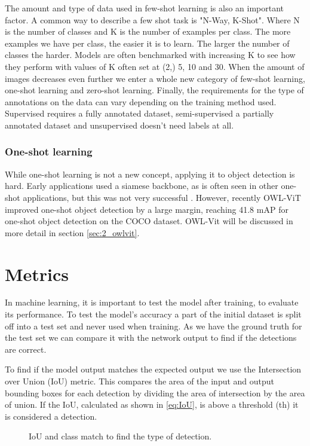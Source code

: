 The amount and type of data used in few-shot learning is also an important factor. A common way to describe a few shot task is "N-Way, K-Shot". Where N is the number of classes and K is the number of examples per class. The more examples we have per class, the easier it is to learn. The larger the number of classes the harder. Models are often benchmarked with increasing K to see how they perform with values of K often set at (2,) 5, 10 and 30. When the amount of images decreases even further we enter a whole new category of few-shot learning, one-shot learning and zero-shot learning. Finally, the requirements for the type of annotations on the data can vary depending on the training method used. Supervised requires a fully annotated dataset, semi-supervised a partially annotated dataset and unsupervised doesn't need labels at all.

\subsubsection*{One-shot learning}

While one-shot learning is not a new concept, applying it to object detection is hard. Early applications used a siamese backbone, as is often seen in other one-shot applications, but this was not very successful \citep{One-shot-siamese}. However, recently OWL-ViT \citep{owlvit} improved one-shot object detection by a large margin, reaching 41.8 mAP for one-shot object detection on the COCO dataset. OWL-Vit will be discussed in more detail in section \ref{sec:2_owlvit}.


\section{Metrics}
In machine learning, it is important to test the model after training, to evaluate its performance. To test the model's accuracy a part of the initial dataset is split off into a test set and never used when training. As we have the ground truth for the test set we can compare it with the network output to find if the detections are correct. 

To find if the model output matches the expected output we use the Intersection over Union (IoU) metric. This compares the area of the input and output bounding boxes for each detection by dividing the area of intersection by the area of union. If the IoU, calculated as shown in \ref{eq:IoU}, is above a threshold (th) it is considered a detection.

\begin{figure}[h]
	\centering
	
	\caption{\label{fig:2_IoU_det} IoU and class match to find the type of detection.}
\end{figure}

